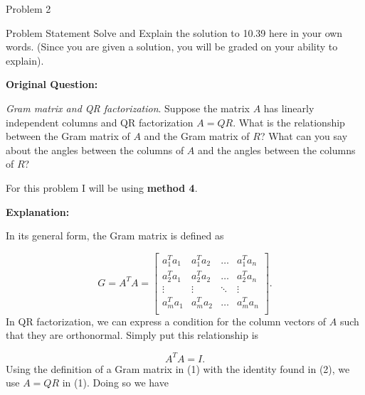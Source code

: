 \begin{problem}{Problem 2}
    \begin{statement}{Problem Statement}
        Solve and Explain the solution to 10.39  here in your own words. (Since you are given a solution, you will be graded on your ability to explain). \vspace*{1em}

        \noindent \textbf{Original Question:} \vspace*{1em}

        \textit{Gram matrix and QR factorization}. Suppose the matrix $A$ has linearly independent columns and QR factorization $A = QR$. What is the relationship between the Gram matrix of $A$ and 
        the Gram matrix of $R$? What can you say about the angles between the columns of $A$ and the angles between the columns of $R$?
    \end{statement}

    \begin{highlight}[Solution]
        \noindent For this problem I will be using \textbf{method 4}. \vspace*{1em}

        \noindent \textbf{Explanation:} \vspace*{1em}

        In its general form, the Gram matrix is defined as 

        \setcounter{equation}{0}
        \begin{equation}
            G = A^{T}A = 
            \begin{bmatrix}
                a_{1}^{T}a_{1} & a_{1}^{T}a_{2} & \dots & a_{1}^{T}a_{n} \\
                a_{2}^{T}a_{1} & a_{2}^{T}a_{2} & \dots & a_{2}^{T}a_{n} \\
                \vdots & \vdots & \ddots & \vdots \\
                a_{m}^{T}a_{1} & a_{m}^{T}a_{2} & \dots & a_{m}^{T}a_{n} \\
            \end{bmatrix}.
        \end{equation}
        In QR factorization, we can express a condition for the column vectors of $A$ such that they are orthonormal. Simply put this relationship is 

        \begin{equation}
            A^{T}A = I.
        \end{equation}
        Using the definition of a Gram matrix in (1) with the identity found in (2), we use $A = QR$ in (1). Doing so we have 


\end{highlight}
\end{problem}
